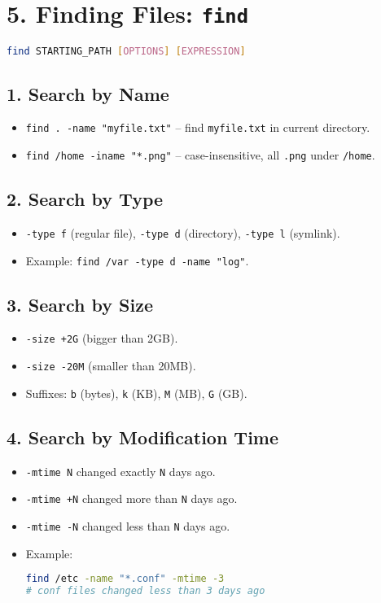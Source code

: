 \documentclass[a4paper]{report}
\begin{document}
\section*{5. Finding Files: \texttt{find}}
\begin{lstlisting}[language=bash]
find STARTING_PATH [OPTIONS] [EXPRESSION]
\end{lstlisting}

\subsection*{1. Search by Name}
\begin{itemize}
    \item \texttt{find . -name "myfile.txt"} -- find \texttt{myfile.txt} in current directory.
    \item \texttt{find /home -iname "*.png"} -- case-insensitive, all \texttt{.png} under \texttt{/home}.
\end{itemize}

\subsection*{2. Search by Type}
\begin{itemize}
    \item \texttt{-type f} (regular file), \texttt{-type d} (directory), \texttt{-type l} (symlink).
    \item Example: \texttt{find /var -type d -name "log"}.
\end{itemize}

\subsection*{3. Search by Size}
\begin{itemize}
    \item \texttt{-size +2G} (bigger than 2GB).
    \item \texttt{-size -20M} (smaller than 20MB).
    \item Suffixes: \texttt{b} (bytes), \texttt{k} (KB), \texttt{M} (MB), \texttt{G} (GB).
\end{itemize}

\subsection*{4. Search by Modification Time}
\begin{itemize}
    \item \texttt{-mtime N} \textrightarrow changed exactly \texttt{N} days ago.
    \item \texttt{-mtime +N} \textrightarrow changed more than \texttt{N} days ago.
    \item \texttt{-mtime -N} \textrightarrow changed less than \texttt{N} days ago.
    \item Example:
        \begin{lstlisting}[language=bash]
find /etc -name "*.conf" -mtime -3
# conf files changed less than 3 days ago
        \end{lstlisting}
\end{itemize}
\end{document}
